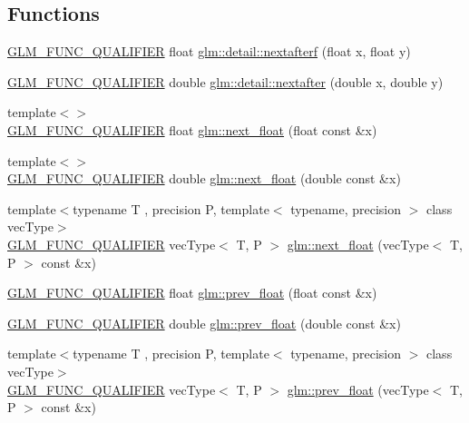 \subsection*{Functions}
\begin{DoxyCompactItemize}
\item 
\hyperlink{setup_8hpp_a33fdea6f91c5f834105f7415e2a64407}{G\+L\+M\+\_\+\+F\+U\+N\+C\+\_\+\+Q\+U\+A\+L\+I\+F\+I\+ER} float \hyperlink{namespaceglm_1_1detail_ab0eb795c482130b1d6c83470bdb031e6}{glm\+::detail\+::nextafterf} (float x, float y)
\item 
\hyperlink{setup_8hpp_a33fdea6f91c5f834105f7415e2a64407}{G\+L\+M\+\_\+\+F\+U\+N\+C\+\_\+\+Q\+U\+A\+L\+I\+F\+I\+ER} double \hyperlink{namespaceglm_1_1detail_a3c14f8400407e8b4cff5be12ceef2c1e}{glm\+::detail\+::nextafter} (double x, double y)
\item 
{\footnotesize template$<$$>$ }\\\hyperlink{setup_8hpp_a33fdea6f91c5f834105f7415e2a64407}{G\+L\+M\+\_\+\+F\+U\+N\+C\+\_\+\+Q\+U\+A\+L\+I\+F\+I\+ER} float \hyperlink{namespaceglm_a094d145a4ae8efb9e42e88883cfb15f1}{glm\+::next\+\_\+float} (float const \&x)
\item 
{\footnotesize template$<$$>$ }\\\hyperlink{setup_8hpp_a33fdea6f91c5f834105f7415e2a64407}{G\+L\+M\+\_\+\+F\+U\+N\+C\+\_\+\+Q\+U\+A\+L\+I\+F\+I\+ER} double \hyperlink{namespaceglm_a451149113e1a5083fcba0546de81ad51}{glm\+::next\+\_\+float} (double const \&x)
\item 
{\footnotesize template$<$typename T , precision P, template$<$ typename, precision $>$ class vec\+Type$>$ }\\\hyperlink{setup_8hpp_a33fdea6f91c5f834105f7415e2a64407}{G\+L\+M\+\_\+\+F\+U\+N\+C\+\_\+\+Q\+U\+A\+L\+I\+F\+I\+ER} vec\+Type$<$ T, P $>$ \hyperlink{namespaceglm_a7e678a59e625a9453c8847e3d0e01625}{glm\+::next\+\_\+float} (vec\+Type$<$ T, P $>$ const \&x)
\item 
\hyperlink{setup_8hpp_a33fdea6f91c5f834105f7415e2a64407}{G\+L\+M\+\_\+\+F\+U\+N\+C\+\_\+\+Q\+U\+A\+L\+I\+F\+I\+ER} float \hyperlink{namespaceglm_a1fd407652d7ccfbe810674a2e5cbc8eb}{glm\+::prev\+\_\+float} (float const \&x)
\item 
\hyperlink{setup_8hpp_a33fdea6f91c5f834105f7415e2a64407}{G\+L\+M\+\_\+\+F\+U\+N\+C\+\_\+\+Q\+U\+A\+L\+I\+F\+I\+ER} double \hyperlink{namespaceglm_a82cdd5674b80569f118b33a6a327c9bd}{glm\+::prev\+\_\+float} (double const \&x)
\item 
{\footnotesize template$<$typename T , precision P, template$<$ typename, precision $>$ class vec\+Type$>$ }\\\hyperlink{setup_8hpp_a33fdea6f91c5f834105f7415e2a64407}{G\+L\+M\+\_\+\+F\+U\+N\+C\+\_\+\+Q\+U\+A\+L\+I\+F\+I\+ER} vec\+Type$<$ T, P $>$ \hyperlink{namespaceglm_a90916626e6b0ed925938226f31b38c6b}{glm\+::prev\+\_\+float} (vec\+Type$<$ T, P $>$ const \&x)

\end{DoxyCompactItemize}
